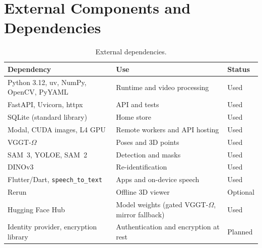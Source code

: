 \section{External Components and Dependencies}
\begin{table}[H]\centering\footnotesize
\caption{External dependencies.}\label{tab:external-dependencies}
\begin{tabularx}{\textwidth}{@{}L{4.6cm} Y l@{}}\toprule
{}\textbf{Dependency} & \textbf{Use} & \textbf{Status}\\\midrule
Python 3.12, uv, NumPy, OpenCV, PyYAML & Runtime and video processing & Used\\
FastAPI, Uvicorn, httpx & API and tests & Used\\
SQLite (standard library) & Home store & Used\\
Modal, CUDA images, L4 GPU & Remote workers and API hosting & Used\\
VGGT-$\Omega$ & Poses and 3D points & Used\\
SAM~3, YOLOE, SAM~2 & Detection and masks & Used\\
DINOv3 & Re-identification & Used\\
Flutter/Dart, \texttt{speech\_to\_text} & Apps and on-device speech & Used\\
Rerun & Offline 3D viewer & Optional\\
Hugging Face Hub & Model weights (gated VGGT-$\Omega$, mirror fallback) & Used\\
Identity provider, encryption library & Authentication and encryption at rest & Planned\\
\bottomrule\end{tabularx}\end{table}

